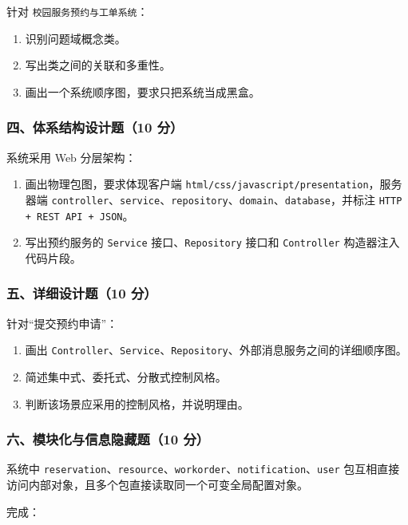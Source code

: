 \documentclass[UTF8,zihao=-4]{ctexart}
\begin{document}
针对 \texttt{校园服务预约与工单系统}：


\begin{enumerate}
\item 识别问题域概念类。
\item 写出类之间的关联和多重性。
\item 画出一个系统顺序图，要求只把系统当成黑盒。
\end{enumerate}


\subsubsection*{四、体系结构设计题（10 分）}


系统采用 Web 分层架构：


\begin{enumerate}
\item 画出物理包图，要求体现客户端 \texttt{html/css/javascript/presentation}，服务器端 \texttt{controller}、\texttt{service}、\texttt{repository}、\texttt{domain}、\texttt{database}，并标注 \texttt{HTTP + REST API + JSON}。
\item 写出预约服务的 \texttt{Service} 接口、\texttt{Repository} 接口和 \texttt{Controller} 构造器注入代码片段。
\end{enumerate}


\subsubsection*{五、详细设计题（10 分）}


针对“提交预约申请”：


\begin{enumerate}
\item 画出 \texttt{Controller}、\texttt{Service}、\texttt{Repository}、外部消息服务之间的详细顺序图。
\item 简述集中式、委托式、分散式控制风格。
\item 判断该场景应采用的控制风格，并说明理由。
\end{enumerate}


\subsubsection*{六、模块化与信息隐藏题（10 分）}


系统中 \texttt{reservation}、\texttt{resource}、\texttt{workorder}、\texttt{notification}、\texttt{user} 包互相直接访问内部对象，且多个包直接读取同一个可变全局配置对象。


完成：
\end{document}
